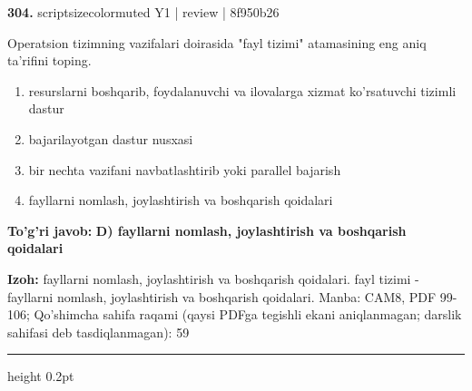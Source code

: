 \documentclass[10pt,a4paper]{article}
\begin{document}
{\bfseries\sffamily\color{ink} 304.} {scriptsizecolor{muted} Y1 | review | 8f950b26}
\par
Operatsion tizimning vazifalari doirasida "fayl tizimi" atamasining eng aniq ta'rifini toping.
\begin{enumerate}[label=\Alph*),leftmargin=9mm]
\item resurslarni boshqarib, foydalanuvchi va ilovalarga xizmat ko'rsatuvchi tizimli dastur
\item bajarilayotgan dastur nusxasi
\item bir nechta vazifani navbatlashtirib yoki parallel bajarish
\item fayllarni nomlash, joylashtirish va boshqarish qoidalari
\end{enumerate}
\begin{tcolorbox}[enhanced,breakable,colback=teal!4,colframe=teal!60!black,boxrule=0.45pt,arc=1.2mm,left=2.7mm,right=2.7mm,top=1.8mm,bottom=1.8mm,before skip=2mm,after skip=2mm]
{\bfseries\sffamily\color{teal}To'g'ri javob:} \textbf{D) fayllarni nomlash, joylashtirish va boshqarish qoidalari}
\par\smallskip
{\bfseries Izoh:} fayllarni nomlash, joylashtirish va boshqarish qoidalari. fayl tizimi - fayllarni nomlash, joylashtirish va boshqarish qoidalari. Manba: CAM8, PDF 99-106; Qo'shimcha sahifa raqami (qaysi PDFga tegishli ekani aniqlanmagan; darslik sahifasi deb tasdiqlanmagan): 59
\end{tcolorbox}
\vspace{2mm}\hrule height 0.2pt\vspace{3mm}
\end{document}
